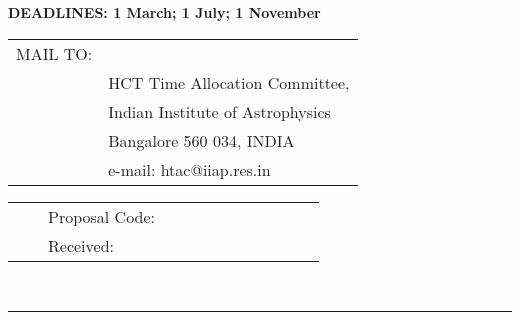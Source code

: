 \centerline{{}}
\vskip 1mm
\centerline{}
\rm
\centerline{\bf {DEADLINES: 1 March; 1 July; 1 November}}

\begin{tabular}{lll}
MAIL TO:&&\\
&\multicolumn{2}{l}{HCT Time Allocation Committee,}\\          
&\multicolumn{2}{l}{Indian Institute of Astrophysics}  \\  
&\multicolumn{2}{l}{Bangalore 560 034, INDIA}  \\  
&\multicolumn{2}{l}{e-mail: htac@iiap.res.in}  \\                  
\end{tabular}                                                              
\begin{tabular}{l|ll|}                                                       
\cline{2-3} &&{\small \sf Proposal Code:} \\[1cm]                                 
&&{\small \sf Received:} ~~~~~~~~~~~~~~~~~~~~~~~~\\[1mm] \cline{2-3} \end{tabular}
\\
\hrule
